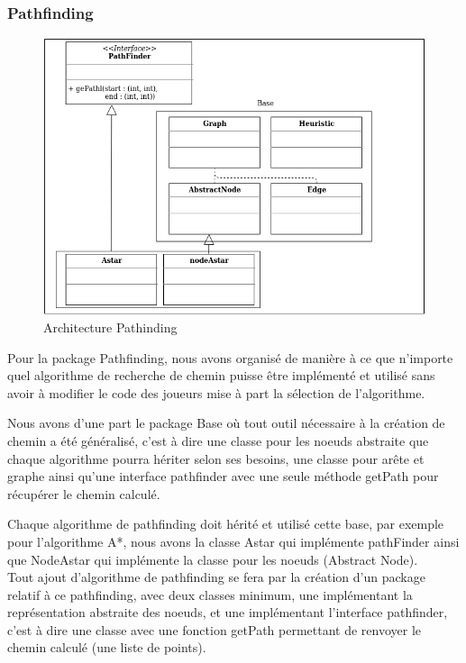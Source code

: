 \subsubsection{Pathfinding}

\begin{figure}[H]
    \centering
    \includegraphics[scale=0.7]{data/pathfindingArchi.png}
    \caption{Architecture Pathinding}
    \label{}
\end{figure}
Pour la package Pathfinding, nous avons organisé de manière à ce que n'importe quel algorithme de recherche de chemin puisse être implémenté et utilisé sans avoir à modifier le code des joueurs mise à part la sélection de l'algorithme.

Nous avons d'une part le package Base où tout outil nécessaire à la création de chemin a été généralisé, c'est à dire une classe pour les noeuds abstraite que chaque algorithme pourra hériter selon ses besoins, une classe pour arête et graphe ainsi qu'une interface pathfinder avec une seule méthode getPath pour récupérer le chemin calculé.

Chaque algorithme de pathfinding doit hérité et utilisé cette base, par exemple pour l'algorithme A*, nous avons la classe Astar qui implémente pathFinder ainsi que NodeAstar qui implémente la classe pour les noeuds (Abstract Node).
\\
Tout ajout d'algorithme de pathfinding se fera par la création d'un package relatif à ce pathfinding, avec deux classes minimum, une implémentant la représentation abstraite des noeuds, et une implémentant l'interface pathfinder, c'est à dire une classe avec une fonction getPath permettant de renvoyer le chemin calculé (une liste de points).

